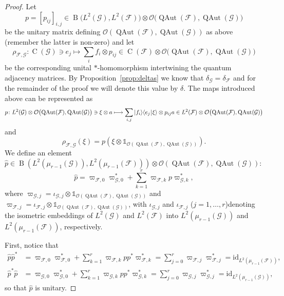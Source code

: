 \documentclass[11pt,reqno]{amsart}
\newcommand{\id}{\mathrm{id}}
\newcommand{\I}{\mathds{1}}
\newcommand{\tens}{\otimes}
\newcommand{\is}[2]{{\left\langle{#1}\,\vline\,#2\right\rangle}}
\newcommand{\ket}[1]{{\left|#1\right\rangle}}
\DeclareMathOperator{\QAut}{QAut}
\DeclareMathOperator{\B}{B}
\DeclareMathOperator{\C}{C}
\begin{document}
\begin{proof}
Let
\[
p=[p_{ij}]_{i,j}\in\B\bigl(L^2(\mathcal{G}),L^2(\mathcal{F})\bigr)\tens\mathcal{O}\bigl(\QAut(\mathcal{F}),\QAut(\mathcal{G})\bigr)
\]
be the unitary matrix defining $\mathcal{O}(\QAut(\mathcal{F}),\QAut(\mathcal{G}))$ as above (remember the latter is non-zero) and let
\[
\rho_{\scriptscriptstyle\mathcal{F},\mathcal{G}}\colon\C(\mathcal{G})\ni e_j\longmapsto\sum\limits_i f_i\tens p_{ij}\in\C(\mathcal{F})\tens\mathcal{O}\bigl(\QAut(\mathcal{F}),\QAut(\mathcal{G})\bigr)
\]
be the corresponding unital $*$-homomorphism intertwining the quantum adjacency matrices. By Proposition~\ref{prop:deltas} we know that $\delta_{\scriptscriptstyle\mathcal{G}}=\delta_{\scriptscriptstyle\mathcal{F}}$ and for the remainder of the proof we will denote this value by $\delta$. The maps introduced above can be represented as
\[
p\colon L^2(\mathcal{G})\tens\mathcal{O}\bigl(\QAut(\mathcal{F}),\QAut(\mathcal{G})\bigr)\ni\xi\tens a\longmapsto\sum\limits_{i,j}\ket{f_i}\is{e_j}{\xi}\tens p_{ij}a\in L^2(\mathcal{F})\tens\mathcal{O}\bigl(\QAut(\mathcal{F}),\QAut(\mathcal{G})\bigr)
\]
and
\[
\rho_{\scriptscriptstyle\mathcal{F},\mathcal{G}}(\xi)=p(\xi\tens \I_{\mathcal{O}(\QAut(\mathcal{F}),\QAut(\mathcal{G}))}).
\]
We define an element $\widehat{p}\in\B(L^2(\mu_{r-1}(\mathcal{G})),L^2(\mu_{r-1}(\mathcal{F})))\tens\mathcal{O}(\QAut(\mathcal{F}),\QAut(\mathcal{G}))$:
\[
\widehat{p}=\varpi_{\scriptscriptstyle\mathcal{F},0}\varpi_{\scriptscriptstyle\mathcal{G},0}^*+\sum\limits_{k=1}^r\varpi_{\scriptscriptstyle\mathcal{F},k} p\varpi_{\scriptscriptstyle\mathcal{G},k}^*,
\]
where $\varpi_{\scriptscriptstyle\mathcal{G},j}=\iota_{\scriptscriptstyle\mathcal{G},j}\tens\I_{\mathcal{O}(\QAut(\mathcal{F}),\QAut(\mathcal{G}))}$ and $\varpi_{\scriptscriptstyle\mathcal{F},j}=\iota_{\scriptscriptstyle\mathcal{F},j}\tens\I_{\mathcal{O}(\QAut(\mathcal{F}),\QAut(\mathcal{G}))}$, with $\iota_{\scriptscriptstyle\mathcal{G},j}$ and $\iota_{\scriptscriptstyle\mathcal{F},j}$ ($j=1,\ldots,r$)denoting the isometric embeddings of $L^2(\mathcal{G})$ and $L^2(\mathcal{F})$ into $L^2(\mu_{r-1}(\mathcal{G}))$ and $L^2(\mu_{r-1}(\mathcal{F}))$, respectively.

First, notice that
\[
\begin{aligned}
\widehat{p}\widehat{p}^*&=\varpi_{\scriptscriptstyle\mathcal{F},0}\varpi_{\scriptscriptstyle\mathcal{F},0}^* +\sum\limits_{k=1}^r\varpi_{\scriptscriptstyle\mathcal{F},k} pp^*\varpi_{\scriptscriptstyle\mathcal{F},k}^* =\sum\limits_{j=0}^r\varpi_{\scriptscriptstyle\mathcal{F},j}\varpi_{\scriptscriptstyle\mathcal{F},j}^*=\id_{L^2(\mu_{r-1}(\mathcal{F}))},\\
\widehat{p}^*\widehat{p}&=\varpi_{\scriptscriptstyle\mathcal{G},0}\varpi_{\scriptscriptstyle\mathcal{G},0}^* +\sum\limits_{k=1}^r\varpi_{\scriptscriptstyle\mathcal{G},k} pp^*\varpi_{\scriptscriptstyle\mathcal{G},k}^* =\sum\limits_{j=0}^r\varpi_{\scriptscriptstyle\mathcal{G},j}\varpi_{\scriptscriptstyle\mathcal{G},j}^*=\id_{L^2(\mu_{r-1}(\mathcal{G}))},
\end{aligned}
\]
so that $\widehat{p}$ is unitary.


\end{proof}
\end{document}
